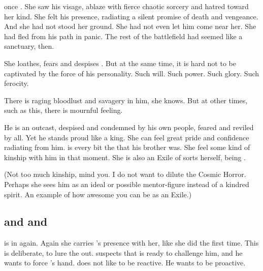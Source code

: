 \Achsah once . 
She saw his visage, ablaze with fierce chaotic sorcery and hatred toward her kind. 
She felt his presence, radiating a silent promise of death and vengeance. 
And she had not stood her ground. 
She had not even let him come near her. 
She had fled from his path in panic. 
The rest of the battlefield had seemed like a sanctuary, then. 

\begin{prose}
\end{prose}



She loathes, fears and despises \Ishnaruchaefir. 
But at the same time, it is hard not to be captivated by the force of his personality. 
Such will. 
Such power. 
Such glory. 
Such ferocity. 

There is raging bloodlust and savagery in him, she knows. 
But at other times, such as this, there is mournful feeling. 

He is an outcast, despised and condemned by his own people, feared and reviled by all. 
Yet he stands proud like a king. 
She can feel great pride and confidence radiating from him.
\Ishnaruchaefir is every bit the \dragonking{} that his brother \Nexagglachel{} was. 
She feel some kind of kinship with him in that moment. 
She is also an Exile of sorts herself, being \ashenblooded. 

(Not too much kinship, mind you. 
 I do not want to dilute the Cosmic Horror.
 Perhaps she sees him as an ideal or possible mentor-figure instead of a kindred spirit.
 An example of how awesome you can be as an Exile.)

\begin{prose}
\end{prose}








\subsection{\Teshrial and \Criseis and \Ishnaruchaefir}
\Criseis is in \Malcur again. 
Again she carries \Ishnaruchaefir's presence with her, like she did the first time. 
This is deliberate, to lure the \resphain out. 
\Ishnaruchaefir suspects that \Teshrial is ready to challenge him, and he wants to force \Teshrial's hand. 
\Ishnaruchaefir does not like to be reactive. 
He wants to be proactive. 

